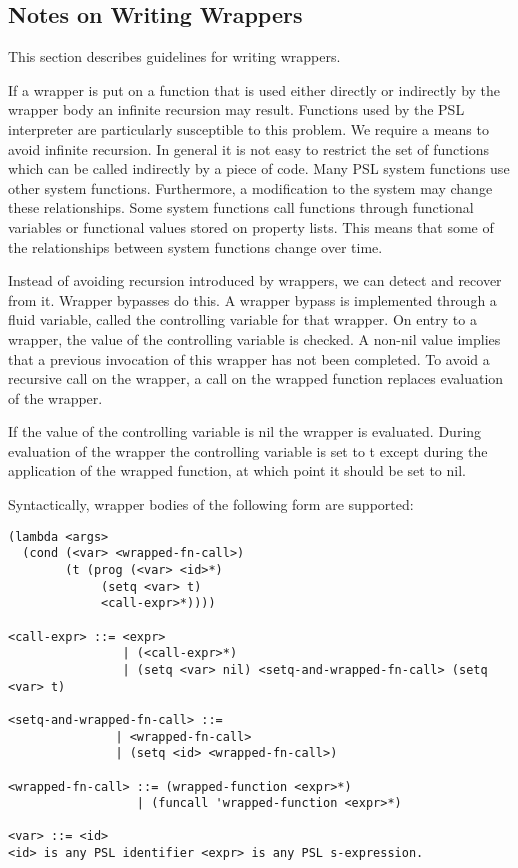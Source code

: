 \subsection{Notes on Writing Wrappers}

  This section describes guidelines for writing wrappers.

  If a wrapper is put on a function that is used either directly
or indirectly by the wrapper  body  an  infinite  recursion  may
result.   Functions used by the PSL interpreter are particularly
susceptible to this problem.    We  require  a  means  to  avoid
infinite  recursion.   In general it is not easy to restrict the
set of functions which can be called indirectly by  a  piece  of
code.   Many  PSL  system  functions use other system functions.
Furthermore, a modification  to  the  system  may  change  these
relationships.    Some  system  functions call functions through
functional variables or functional  values  stored  on  property
lists.  This means that some of the relationships between system
functions change over time.

  Instead  of  avoiding recursion introduced by wrappers, we can
detect and recover from  it.   Wrapper  bypasses  do  this.    A
wrapper  bypass  is implemented through a fluid variable, called
the controlling variable for  that  wrapper.    On  entry  to  a
wrapper,  the  value  of  the controlling variable is checked. A
non-nil value implies that a previous invocation of this wrapper
has not been completed.   To  avoid  a  recursive  call  on  the
wrapper,  a  call on the wrapped function replaces evaluation of
the wrapper.

  If the value of the controlling variable is nil the wrapper is
evaluated.  During evaluation of  the  wrapper  the  controlling
variable  is  set  to  t  except  during  the application of the
wrapped function, at which point it should be set to nil.

  Syntactically,  wrapper  bodies  of  the  following  form  are
supported:

\begin{verbatim}
(lambda <args>
  (cond (<var> <wrapped-fn-call>)
        (t (prog (<var> <id>*)
             (setq <var> t)
             <call-expr>*))))
 
<call-expr> ::= <expr>
                | (<call-expr>*)
                | (setq <var> nil) <setq-and-wrapped-fn-call> (setq <var> t)
 
<setq-and-wrapped-fn-call> ::=
               | <wrapped-fn-call>
               | (setq <id> <wrapped-fn-call>)
 
<wrapped-fn-call> ::= (wrapped-function <expr>*)
                  | (funcall 'wrapped-function <expr>*)

<var> ::= <id>
<id> is any PSL identifier <expr> is any PSL s-expression.
\end{verbatim}

